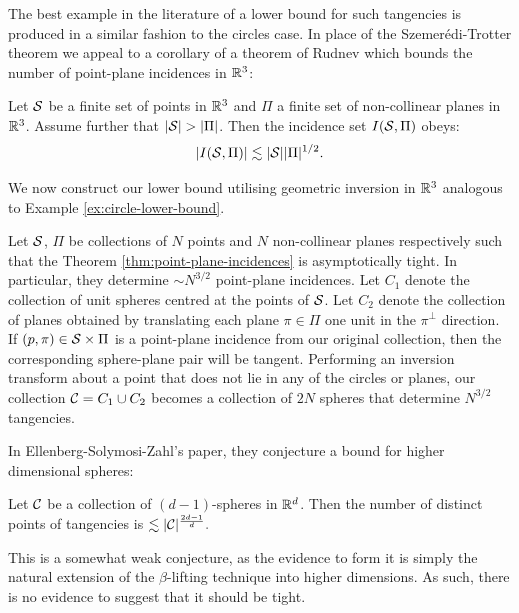 The best example in the literature of a lower bound for such tangencies is produced in a similar fashion to the circles case. 
In place of the Szemerédi-Trotter theorem we appeal to a corollary of a theorem of Rudnev which bounds the number of point-plane incidences in $\mathbb R^3$:\cite{Rudnev2014planepoints}
\begin{theorem}
    Let $\mathcal S$ be a finite set of points in $\mathbb R^3$ and $\Pi$ a finite set of non-collinear planes in $\mathbb R^3$. Assume further that $|\ES|> |\Pi|$.
     Then the incidence set $I(\mathcal S, \Pi)$ obeys:
    \[
        |I(\mathcal S, \Pi)| \lesssim |\mathcal S||\Pi|^{1/2}.
    \] \label{thm:point-plane-incidences}
\end{theorem}
We now construct our lower bound utilising geometric inversion in $\mathbb R^3$ analogous to Example \ref{ex:circle-lower-bound}.
\begin{example}
    Let $\mathcal S$, $\Pi$ be collections of $N$ points and $N$ non-collinear planes respectively such that the Theorem \ref{thm:point-plane-incidences} is asymptotically tight. 
    In particular, they determine $\sim N^{3/2}$ point-plane incidences. 
    Let $C_1$ denote the collection of unit spheres centred at the points of $\mathcal S$. 
    Let $C_2$ denote the collection of planes obtained by translating each plane $\pi \in \Pi$ one unit in the $\pi^{\perp}$ direction.
    If $(p,\pi) \in \mathcal S \times \Pi$ is a point-plane incidence from our original collection, then the corresponding sphere-plane pair will be tangent.
    Performing an inversion transform about a point that does not lie in any of the circles or planes, our collection $\mathcal C = C_1 \cup C_2$ becomes a 
    collection of $2N$ spheres that determine $N^{3/2}$ tangencies.
 \end{example}

 In Ellenberg-Solymosi-Zahl's paper,\cite{ellenberg2016new} they conjecture a bound for higher dimensional spheres:
 \begin{conjecture}
     Let $\mathcal C$ be a collection of $(d-1)$-spheres in $\mathbb R^d$. Then the number of distinct points of tangencies is $\lesssim |\mathcal C|^{\frac{2d-1}{d}}.$
 \end{conjecture}

This is a somewhat weak conjecture, as the evidence to form it is simply the natural extension of the $\beta$-lifting technique into higher dimensions.
As such, there is no evidence to suggest that it should be tight. 
